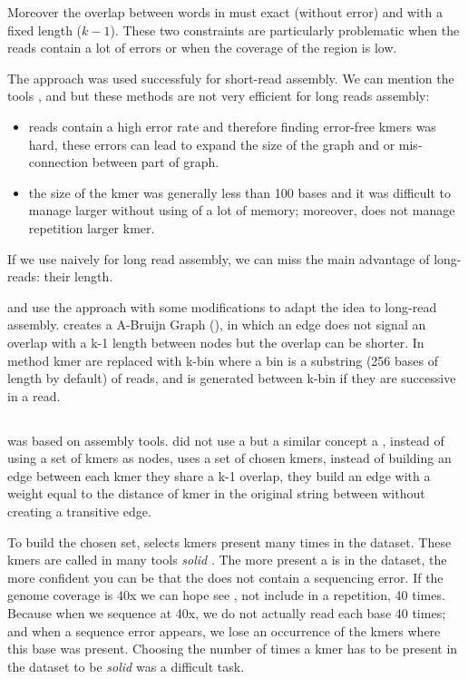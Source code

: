 \documentclass[main]{subfiles}
\begin{document}
Moreover the overlap between words in \DBG must exact (without error) and with a fixed length ($k - 1$). These two constraints are particularly problematic when the reads contain a lot of errors or when the coverage of the region is low.

The \DBG approach was used successfuly for short-read assembly. We can mention the tools  \cite{spades},  \cite{minia} and \cite{megahit} but these methods are not very efficient for long reads assembly:
\begin{itemize}
    \item reads contain a high error rate and therefore finding error-free kmers was hard, these errors can lead to expand the size of the graph and or mis-connection between part of graph.
    \item the size of the kmer was generally less than 100 bases and it was difficult to manage larger without using of a lot of memory; moreover, \DBG does not manage repetition larger kmer.
\end{itemize}

If we use \DBG naively for long read assembly, we can miss the main advantage of long-reads: their length.

\flye and \wtdbg use the \DBG approach with some modifications to adapt the idea to long-read assembly. \flye creates a A-Bruijn Graph (), in which an edge does not signal an overlap with a k-1 length between nodes but the overlap can be shorter. In \wtdbg method kmer are replaced with k-bin where a bin is a substring (256 bases of length by default) of reads, and is generated between k-bin if they are successive in a read.

\subsection{\flye}

\flye\cite{Flye} was based on \abruijn\cite{abruijn} assembly tools. \abruijn did not use a \DBG but a similar concept a , instead of using a set of kmers as nodes,  uses a set of chosen kmers, instead of building an edge between each kmer they share a k-1 overlap, they build an edge with a weight equal to the distance of kmer in the original string between without creating a transitive edge.

To build the chosen \kmers set, \abruijn selects kmers present many times in the dataset. These kmers are called in many tools \textit{solid} \kmers {} . The more present a \kmer is in the dataset, the more confident you can be that the \kmer does not contain a sequencing error. If the genome coverage is 40x we can hope see \kmer, not include in a repetition, 40 times. Because when we sequence at 40x, we do not actually read each base 40 times; and when a sequence error appears, we lose an occurrence of the kmers where this base was present. Choosing the number of times a kmer has to be present in the dataset to be \textit{solid} was a difficult task.
\end{document}

